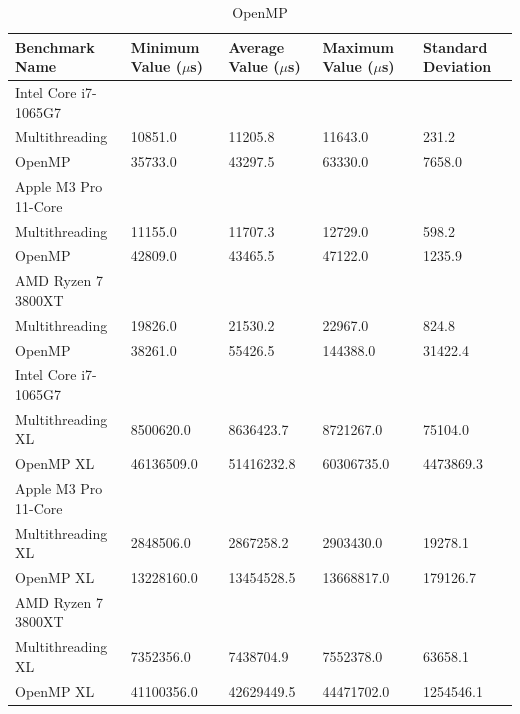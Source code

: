 \documentclass[modern,longauthor]{aastex7}
\begin{document}
\begin{table}[htb!]
\centering

\caption{OpenMP\label{tab:openmp}}
\begin{tabular}{p{5cm} p{2cm} p{2cm} p{2cm} p{2cm}}
\hline
Benchmark Name & Minimum Value ($\mu$s) & Average Value ($\mu$s) & Maximum Value ($\mu$s) & Standard Deviation \\
\hline
Intel Core i7-1065G7 \\
\hspace{0.5cm}Multithreading & 10851.0 & 11205.8 & 11643.0 & 231.2 \\
\hspace{0.5cm}OpenMP & 35733.0 & 43297.5 & 63330.0 & 7658.0 \\
Apple M3 Pro 11-Core \\
\hspace{0.5cm}Multithreading & 11155.0 & 11707.3 & 12729.0 & 598.2 \\
\hspace{0.5cm}OpenMP & 42809.0 & 43465.5 & 47122.0 & 1235.9 \\
AMD Ryzen 7 3800XT \\
\hspace{0.5cm}Multithreading & 19826.0 & 21530.2 & 22967.0 & 824.8 \\
\hspace{0.5cm}OpenMP & 38261.0 & 55426.5 & 144388.0 & 31422.4 \\
\hline
Intel Core i7-1065G7 \\
\hspace{0.5cm}Multithreading XL & 8500620.0 & 8636423.7 & 8721267.0 & 75104.0 \\
\hspace{0.5cm}OpenMP XL & 46136509.0 & 51416232.8 & 60306735.0 & 4473869.3 \\
Apple M3 Pro 11-Core \\
\hspace{0.5cm}Multithreading XL & 2848506.0 & 2867258.2 & 2903430.0 & 19278.1 \\
\hspace{0.5cm}OpenMP XL & 13228160.0 & 13454528.5 & 13668817.0 & 179126.7 \\
AMD Ryzen 7 3800XT \\
\hspace{0.5cm}Multithreading XL & 7352356.0 & 7438704.9 & 7552378.0 & 63658.1 \\
\hspace{0.5cm}OpenMP XL & 41100356.0 & 42629449.5 & 44471702.0 & 1254546.1 \\
\hline
\end{tabular}
\end{table}
\FloatBarrier
\end{document}
